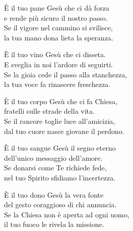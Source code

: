 

\spazio

\strofa È il tuo pane Gesù che ci dà forza\\
e rende più sicuro il nostro passo.\\
Se il vigore nel cammino si svilisce,\\
la tua mano dona lieta la speranza.

\spazio


\spazio

\strofa È il tuo vino Gesù che ci disseta.\\
E sveglia in noi l'ardore di seguirti.\\
Se la gioia cede il passo alla stanchezza,\\
la tua voce fa rinascere freschezza.

\spazio


\spazio

\strofa È il tuo corpo Gesù che ci fa Chiesa,\\
fratelli sulle strade della vita.\\
Se il rancore toglie luce all'amicizia,\\
dal tuo cuore nasce giovane il perdono.

\spazio


\spazio

\strofa È il tuo sangue Gesù il segno eterno\\
dell'unico messaggio dell'amore.\\
Se donarsi come Te richiede fede,\\
nel tuo Spirito sfidiamo l'incertezza.

\spazio


\spazio

\strofa È il tuo dono Gesù la vera fonte\\
del gesto coraggioso di chi annuncia.\\
Se la Chiesa non è aperta ad ogni uomo,\\
il tuo fuoco le rivela la missione.

\spazio


